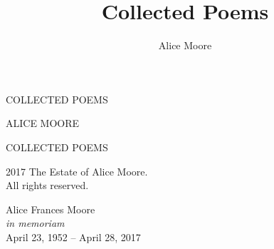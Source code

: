 \documentclass[twoside,openright,final,11pt]{memoir}
\title{Collected Poems}
\author{Alice Moore}
\date{}
\begin{document}
\setlength\epigraphwidth{5cm}
\setlength\epigraphrule{0pt}
\epigraphfontsize{\footnotesize}

\setlength\vgap{2.5em}
\setlength\vleftskip{0.5em}

\PlainPoemTitle

\renewcommand{\printPoemTitletitle}[1]{\PoemTitlefont \uppercase{#1}}

\pagestyle{empty}

\frontmatter

\begin{titlingpage}
\begingroup
\newlength{\drop}
\setlength{\drop}{0.12\textheight}
\vspace*{\drop}
\begin{center}
{\noindent\Huge \textsc{COLLECTED POEMS}}\par
\vspace*{3\drop}
{\noindent\large \textsc{ALICE MOORE}}
\end{center}
\endgroup

\clearpage

\begingroup
\footnotesize
\begin{flushleft}
\textsc{COLLECTED POEMS}

\textcopyright{} 2017 The Estate of Alice Moore.\\
All rights reserved.
\end{flushleft}
\endgroup
\end{titlingpage}

\begingroup
\clearpage
\null\vspace{0.3\textheight}
\begin{center}
Alice Frances Moore\\
\textit{in memoriam}\\
April 23, 1952 -- April 28, 2017
\end{center}
\vfill\cleardoublepage
\endgroup

\setlength{\cftsectionindent}{3.8em}
\tableofcontents*
\clearpage

\renewcommand*{\printbookname}{}
\renewcommand*{\printbooknum}{}
\renewcommand*{\printpartnum}{}
\renewcommand*{\printpartname}{}

\renewcommand{\booktitlefont}{\normalfont\Huge\scshape}


\mainmatter
\pagestyle{myheadings}
\end{document}
